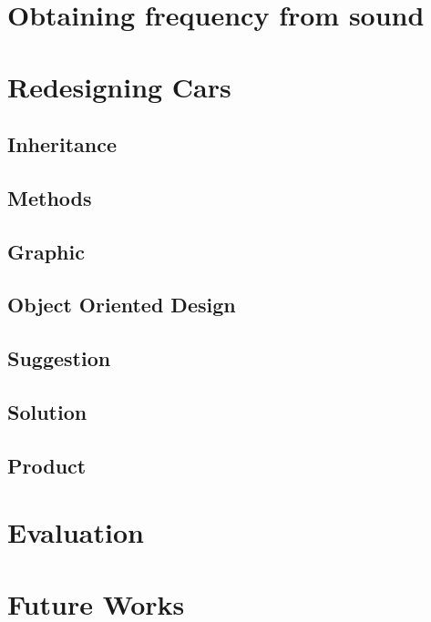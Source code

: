 

\section{Obtaining frequency from sound}


\section{Redesigning Cars}

\subsection{Inheritance}

\subsection{Methods}

\subsection{Graphic}

\subsection{Object Oriented Design}

\subsection{Suggestion}



\subsection{Solution}


\subsection{Product}\label{sprint1:product}


\section{Evaluation}

\section{Future Works}


